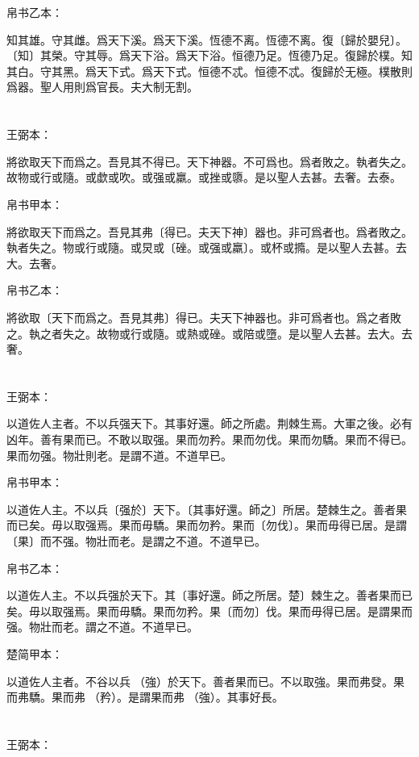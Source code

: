 \documentclass[a5paper]{ctexbook}
\begin{document}
    帛书乙本：

    知其雄。守其雌。爲天下溪。爲天下溪。恆德不离。恆德不离。復〔歸於嬰兒〕。〔知〕其榮。守其辱。爲天下浴。爲天下浴。恒德乃足。恆德乃足。復歸於樸。知其白。守其黑。爲天下式。爲天下式。恒德不忒。恒德不忒。復歸於无極。樸散則爲器。聖人用則爲官長。夫大制无割。

    \chapter{}
    王弼本：

    將欲取天下而爲之。吾見其不得已。天下神器。不可爲也。爲者敗之。執者失之。故物或行或隨。或歔或吹。或强或羸。或挫或隳。是以聖人去甚。去奢。去泰。

    
    帛书甲本：

    將欲取天下而爲之。吾見其弗〔得已。夫天下神〕器也。非可爲者也。爲者敗之。執者失之。物或行或隨。或炅或〔䂳。或强或羸〕。或杯或撱。是以聖人去甚。去大。去奢。

    帛书乙本：

    將欲取〔天下而爲之。吾見其弗〕得已。夫天下神器也。非可爲者也。爲之者敗之。執之者失之。故物或行或隨。或熱或䂳。或陪或墮。是以聖人去甚。去大。去奢。

    \chapter{}
    王弼本：

    以道佐人主者。不以兵强天下。其事好還。師之所處。荆棘生焉。大軍之後。必有凶年。善有果而已。不敢以取强。果而勿矜。果而勿伐。果而勿驕。果而不得已。果而勿强。物壯則老。是謂不道。不道早已。

    
    帛书甲本：

    以道佐人主。不以兵〔强於〕天下。〔其事好還。師之〕所居。楚棘生之。善者果而已矣。毋以取强焉。果而毋驕。果而勿矜。果而〔勿伐〕。果而毋得已居。是謂〔果〕而不强。物壯而老。是謂之不道。不道早已。

    帛书乙本：

    以道佐人主。不以兵强於天下。其〔事好還。師之所居。楚〕棘生之。善者果而已矣。毋以取强焉。果而毋驕。果而勿矜。果〔而勿〕伐。果而毋得已居。是謂果而强。物壯而老。謂之不道。不道早已。

    楚简甲本：

    以道佐人主者。不谷以兵󶴘（強）於天下。善者果而已。不以取強。果而弗癹。果而弗驕。果而弗󶴙（矜）。是謂果而弗󶴘（強）。其事好長。

    \chapter{}
    王弼本：
\end{document}
